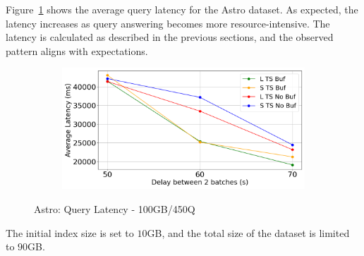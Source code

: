 %
Figure~\ref{fig:query-latency} shows the average query latency for the
Astro dataset. As expected, the latency increases as query answering
becomes more resource-intensive. The latency is calculated as described
in the previous sections, and the observed pattern aligns with expectations.

\begin{figure}
	\centering
	\begin{subfigure}[c]{0.6\textwidth}
		\includegraphics[width=1\textwidth]   {figures/Experiments/Dynamic/ASTRO/average_latency_ASTRO.png}
	\end{subfigure}
	\caption{Astro: Query Latency - 100GB/450Q}
	\label{fig:query-latency}
\end{figure}

The initial index size is set to $10$GB, and the total size of the
dataset is limited to  $90$GB.
 
